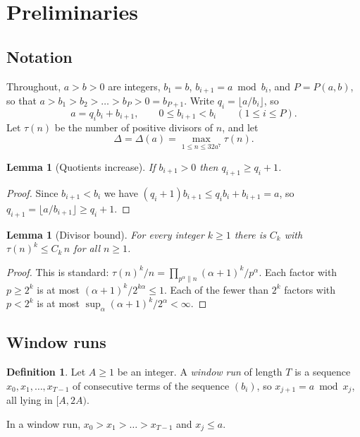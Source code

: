 \documentclass[11pt]{amsart}
\newtheorem{lemma}[theorem]{Lemma}
\theoremstyle{definition}
\newtheorem{definition}[theorem]{Definition}
\theoremstyle{remark}
\begin{document}
\section{Preliminaries}

\subsection{Notation}
Throughout, $a>b>0$ are integers, $b_1=b$, $b_{i+1}=a\bmod b_i$, and $P=P(a,b)$, so that
$a>b_1>b_2>\dots>b_P>0=b_{P+1}$. Write $q_i=\lfloor a/b_i\rfloor$, so
\[
a=q_ib_i+b_{i+1},\qquad 0\le b_{i+1}<b_i\qquad(1\le i\le P).
\]
Let $\tau(n)$ be the number of positive divisors of $n$, and let
\[
\Delta=\Delta(a)=\max_{1\le n\le 32a^7}\tau(n).
\]

\begin{lemma}[Quotients increase]\label{lem:quot}
If $b_{i+1}>0$ then $q_{i+1}\ge q_i+1$.
\end{lemma}

\begin{proof}
Since $b_{i+1}<b_i$ we have $(q_i+1)b_{i+1}\le q_ib_i+b_{i+1}=a$, so
$q_{i+1}=\lfloor a/b_{i+1}\rfloor\ge q_i+1$.
\end{proof}

\begin{lemma}[Divisor bound]\label{lem:div}
For every integer $k\ge1$ there is $C_k$ with $\tau(n)^k\le C_k\,n$ for all $n\ge1$.
\end{lemma}

\begin{proof}
This is standard: $\tau(n)^k/n=\prod_{p^\alpha\| n}(\alpha+1)^k/p^\alpha$. Each factor with
$p\ge 2^k$ is at most $(\alpha+1)^k/2^{k\alpha}\le1$. Each of the fewer than $2^k$ factors with
$p<2^k$ is at most $\sup_\alpha(\alpha+1)^k/2^\alpha<\infty$.
\end{proof}

\subsection{Window runs}

\begin{definition}
Let $A\ge1$ be an integer. A \emph{window run} of length $T$ is a sequence $x_0,x_1,\dots,x_{T-1}$ of
consecutive terms of the sequence $(b_i)$, so $x_{j+1}=a\bmod x_j$, all lying in $[A,2A)$.
\end{definition}

In a window run, $x_0>x_1>\dots>x_{T-1}$ and $x_j\le a$.
\end{document}
